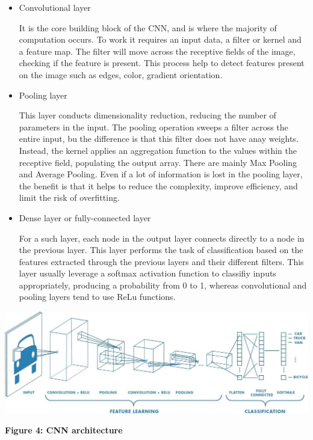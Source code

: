 \documentclass[a4paper, 12pt]{report}
\begin{document}
\begin{itemize}

    \item Convolutional layer

It is the core building block of the CNN, and is where the majority of computation occurs. To work it requires an input data, a filter or kernel and a feature map. The filter will move across the receptive fields of the image, checking if the feature is present. This process help to detect features present on the image such as edges, color, gradient orientation.

    \item Pooling layer

This layer conducts dimensionality reduction, reducing the number of parameters in the input. The pooling operation sweeps a filter across the entire input, bu the difference is that this filter does not have anay weights. Instead, the kernel applies an aggregation function to the values within the receptive field, populating the output array. There are mainly Max Pooling and Average Pooling. Even if a lot of information is lost in the pooling layer, the benefit is that it helps to reduce the complexity, improve efficiency, and limit the risk of overfitting.

    \item Dense layer or fully-connected layer

For a such layer, each node in the output layer connects directly to a node in the previous layer. This layer performs the task of classification based on the features extracted through the previous layers and their different filters. This layer usually leverage a softmax activation function to classifiy inputs appropriately, producing a probability from 0 to 1, whereas convolutional and pooling layers tend to use ReLu functions.

\end{itemize}

\begin{center}

    \includegraphics[height = 0.36 \linewidth]{cnn_architecture.jpeg}


    \textbf{Figure 4: CNN architecture }\cite{cnn_architecture}

\end{center}
\end{document}
